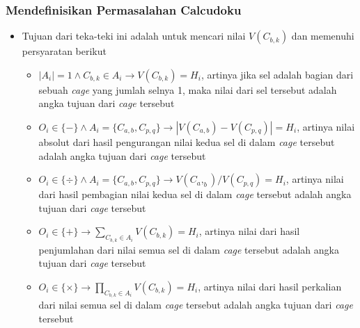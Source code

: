 \documentclass{beamer}
\begin{document}
\begin{frame}
\frametitle{Mendefinisikan Permasalahan Calcudoku}
\begin{itemize}
\item Tujuan dari teka-teki ini adalah untuk mencari nilai \begin{math}V(C_{b,k})\end{math} dan memenuhi persyaratan berikut
	\begin{itemize}
	\item \begin{math}|A_i| = 1 \land C_{b,k} \in A_i \rightarrow V(C_{b,k}) = H_i\end{math}, artinya jika sel adalah bagian dari sebuah \textit{cage} yang jumlah selnya 1, maka nilai dari sel tersebut adalah angka tujuan dari \textit{cage} tersebut
	\item \begin{math}O_i \in \{-\} \land A_i = \{C_{a,b}, C_{p,q}\} \rightarrow |V(C_{a,b}) - V(C_{p,q})| = H_i\end{math}, artinya nilai absolut dari hasil pengurangan nilai kedua sel di dalam \textit{cage} tersebut adalah angka tujuan dari \textit{cage} tersebut
	\item \begin{math}O_i \in \{\div\} \land A_i = \{C_{a,b}, C_{p,q}\} \rightarrow V(C_a,_b) / V(C_{p,q}) = H_i\end{math}, artinya nilai dari hasil pembagian nilai kedua sel di dalam \textit{cage} tersebut adalah angka tujuan dari \textit{cage} tersebut
	\item \begin{math}O_i \in \{+\} \rightarrow \sum_{C_{b,k} \in A_i} V(C_{b,k}) = H_i\end{math}, artinya nilai dari hasil penjumlahan dari nilai semua sel di dalam \textit{cage} tersebut adalah angka tujuan dari \textit{cage} tersebut
	\item \begin{math}O_i \in \{\times\} \rightarrow \prod_{C_{b,k} \in A_i} V(C_{b,k}) = H_i\end{math}, artinya nilai dari hasil perkalian dari nilai semua sel di dalam \textit{cage} tersebut adalah angka tujuan dari \textit{cage} tersebut
	\end{itemize}
\end{itemize}
\end{frame}
\end{document}
